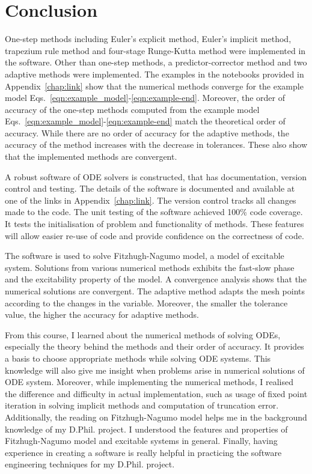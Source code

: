 \chapter{Conclusion}
\label{chap:conclusion}

One-step methods including Euler's explicit method, Euler's implicit method, trapezium rule method and four-stage Runge-Kutta method were implemented in the software. Other than one-step methods, a predictor-corrector method and two adaptive methods were implemented. The examples in the notebooks provided in Appendix~\ref{chap:link} show that the numerical methods converge for the example model Eqs.~\eqref{eqn:example_model}-\eqref{eqn:example-end}. Moreover, the order of accuracy of the one-step methods computed from the example model Eqs.~\ref{eqn:example_model}-\eqref{eqn:example-end} match the theoretical order of accuracy. While there are no order of accuracy for the adaptive methods, the accuracy of the method increases with the decrease in tolerances. These also show that the implemented methods are convergent.

A robust software of ODE solvers is constructed, that has documentation, version control and testing. The details of the software is documented and available at one of the links in Appendix~\ref{chap:link}. The version control tracks all changes made to the code. The unit testing of the software achieved 100\% code coverage. It tests the initialisation of problem and functionality of methods. These features will allow easier re-use of code and provide confidence on the correctness of code.

The software is used to solve Fitzhugh-Nagumo model, a model of excitable system. Solutions from various numerical methods exhibits the fast-slow phase and the excitability property of the model. A convergence analysis shows that the numerical solutions are convergent. The adaptive method adapts the mesh points according to the changes in the variable. Moreover, the smaller the tolerance value, the higher the accuracy for adaptive methods.

From this course, I learned about the numerical methods of solving ODEs, especially the theory behind the methods and their order of accuracy. It provides a basis to choose appropriate methods while solving ODE systems. This knowledge will also give me insight when problems arise in numerical solutions of ODE system. Moreover, while implementing the numerical methods, I realised the difference and difficulty in actual implementation, such as usage of fixed point iteration in solving implicit methods and computation of truncation error. Additionally, the reading on Fitzhugh-Nagumo model helps me in the background knowledge of my D.Phil. project. I understood the features and properties of Fitzhugh-Nagumo model and excitable systems in general. Finally, having experience in creating a software is really helpful in practicing the software engineering techniques for my D.Phil. project.
